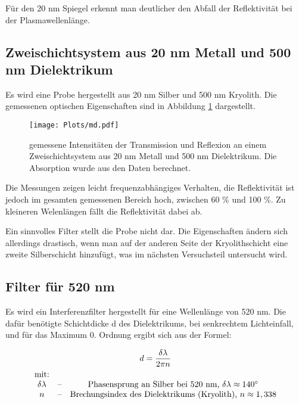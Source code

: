 \documentclass[10pt,twoside]{article}
\renewcommand{\1}{^{-1}}
\renewcommand{\2}{^{-2}}
\newcommand{\3}{^{-3}}
\newcommand{\4}{^{-4}}
\newcommand{\5}{^{-5}}
\newcommand{\6}{^{-6}}
\newcommand{\7}{^{-7}}
\newcommand{\8}{^{-8}}
\newcommand{\9}{^{-9}}
\begin{document}
Für den 20 nm Spiegel erkennt man deutlicher den Abfall der Reflektivität bei der Plasmawellenlänge.

\newpage

\subsection{Zweischichtsystem aus 20 nm Metall und 500 nm Dielektrikum}

Es wird eine Probe hergestellt aus 20 nm Silber und 500 nm Kryolith.
Die gemessenen optischen Eigenschaften sind in Abbildung \ref{fig:md_500} dargestellt.

\begin{figure}[H]
\centering
\texttt{[image: Plots/md.pdf]} \caption{gemessene Intensitäten der Transmission und Reflexion an einem Zweischichtsystem aus 20 nm Metall und 500 nm Dielektrikum. Die Absorption wurde aus den Daten berechnet.}
\label{fig:md_500}
\end{figure}

Die Messungen zeigen leicht frequenzabhängiges Verhalten, die Reflektivität ist jedoch im gesamten gemessenen Bereich hoch, zwischen 60 \% und 100 \%.
Zu kleineren Welenlängen fällt die Reflektivität dabei ab.

Ein sinnvolles Filter stellt die Probe nicht dar. Die Eigenschaften ändern sich allerdings drastisch, wenn man auf der anderen Seite der Kryolithschicht eine zweite Silberschicht hinzufügt, was im nächsten Versuchsteil untersucht wird.

\newpage

\subsection{Filter für 520 nm}

Es wird ein Interferenzfilter hergestellt für eine Wellenlänge von 520 nm.
Die dafür benötigte Schichtdicke d des Dielektrikums, bei senkrechtem Lichteinfall, und für das Maximum 0. Ordnung ergibt sich aus der Formel:

\begin{gather}
d = \frac{\delta \lambda}{2 \pi n}\\
\begin{matrix}
   \text{mit:} &&\\
   \delta \lambda & \text{--} & \text{Phasensprung an Silber bei 520 nm, }\delta \lambda \approx 140^\circ \\
   n & \text{--} & \text{Brechungsindex des Dielektrikums (Kryolith), } n \approx 1,338 \\
\end{matrix}\notag
\end{gather}
\end{document}
